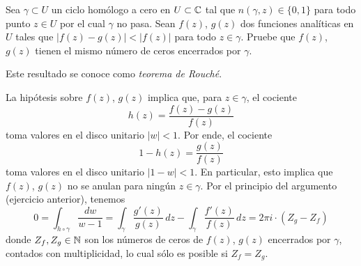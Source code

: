 \begin{exercise}
Sea $\gamma \subset U$ un ciclo homólogo a cero en $U \subset \mathbb C$ tal que $n(\gamma, z) \in \{ 0, 1 \}$ para todo punto $z \in U$ por el cual $\gamma$ no pasa. Sean $f(z)$, $g(z)$ dos funciones analíticas en $U$ tales que $|f(z) - g(z)| < |f(z)|$ para todo $z \in \gamma$. Pruebe que $f(z)$, $g(z)$ tienen el mismo número de ceros encerrados por $\gamma$.
\end{exercise}

\begin{remark}
Este resultado se conoce como \textit{teorema de Rouché}.
\end{remark}

\begin{solution}
La hipótesis sobre $f(z)$, $g(z)$ implica que, para $z \in \gamma$, el cociente
$$h(z) = \frac {f(z) - g(z)} {f(z)}$$
toma valores en el disco unitario $|w| < 1$. Por ende, el cociente
$$1 - h(z) = \frac {g(z)} {f(z)}$$
toma valores en el disco unitario $|1 - w| < 1$. En particular, esto implica que $f(z)$, $g(z)$ no se anulan para ningún $z \in \gamma$. Por el principio del argumento (ejercicio anterior), tenemos
$$
0
    = \int_{h \circ \gamma} \frac {dw} {w - 1}
    = \int_\gamma \frac {g'(z)} {g(z)} \, dz - \int_\gamma \frac {f'(z)} {f(z)} \, dz
    = 2\pi i \cdot (Z_g - Z_f)
$$
donde $Z_f, Z_g \in \mathbb N$ son los números de ceros de $f(z)$, $g(z)$ encerrados por $\gamma$, contados con multiplicidad, lo cual sólo es posible si $Z_f = Z_g$.
\end{solution}
